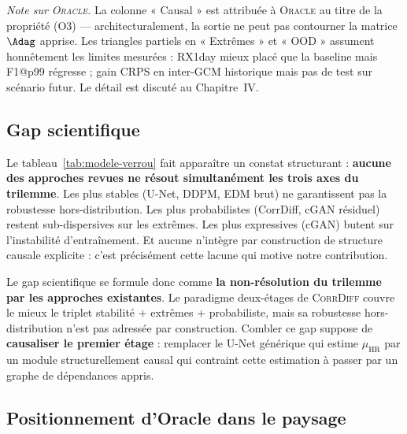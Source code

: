 \documentclass[14pt,a4paper,openany]{extreport}
\newcommand{\Oracle}{\textsc{Oracle}}
\newcommand{\CorrDiff}{\textsc{CorrDiff}}
\newcommand{\HR}{\ensuremath{\text{HR}}}
\newcommand{\muHR}{\ensuremath{\mu_{\HR}}}
\begin{document}
\noindent\emph{Note sur \Oracle{}.} La colonne « Causal » est attribuée à \Oracle{} au titre de la propriété (O3) --- architecturalement, la sortie ne peut pas contourner la matrice $\Adag$ apprise. Les triangles partiels en « Extrêmes » et « OOD » assument honnêtement les limites mesurées : RX1day mieux placé que la baseline mais F1@p99 régresse ; gain CRPS en inter-GCM historique mais pas de test sur scénario futur. Le détail est discuté au Chapitre~IV.

\subsection{Gap scientifique}
\label{ssec:soa-gap}

Le tableau~\ref{tab:modele-verrou} fait apparaître un constat structurant : \textbf{aucune des approches revues ne résout simultanément les trois axes du trilemme}. Les plus stables (U-Net, DDPM, EDM brut) ne garantissent pas la robustesse hors-distribution. Les plus probabilistes (CorrDiff, cGAN résiduel) restent sub-dispersives sur les extrêmes. Les plus expressives (cGAN) butent sur l'instabilité d'entraînement. Et aucune n'intègre par construction de structure causale explicite : c'est précisément cette lacune qui motive notre contribution.

Le gap scientifique se formule donc comme \textbf{la non-résolution du trilemme par les approches existantes}. Le paradigme deux-étages de \CorrDiff{} couvre le mieux le triplet stabilité + extrêmes + probabiliste, mais sa robustesse hors-distribution n'est pas adressée par construction. Combler ce gap suppose de \textbf{causaliser le premier étage} : remplacer le U-Net générique qui estime $\muHR$ par un module structurellement causal qui contraint cette estimation à passer par un graphe de dépendances appris.

\subsection{Positionnement d'Oracle dans le paysage}
\label{ssec:soa-oracle-position}
\end{document}
